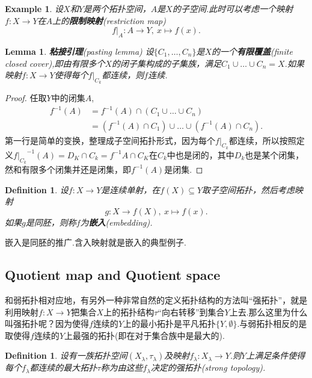 \documentclass{article}
\newtheorem{lemma}[theorem]{Lemma}
\newtheorem{example}[theorem]{Example}
\newtheorem{definition}[theorem]{Definition}
\newcommand*{\xfunc}[4]{{#2}\colon{#3}{#1}{#4}}
\newcommand*{\func}[3]{\xfunc{\to}{#1}{#2}{#3}}
\begin{document}
\begin{example}
设$X$和$Y$是两个拓扑空间，$A$是$X$的子空间.此时可以考虑一个映射$\func{f}{X}{Y}$在$A$上的\textbf{限制映射}(restriction map)\[\func{f|_A}{A}{Y},\ x \mapsto f(x).\]
\end{example}

\begin{lemma}
\textbf{粘接引理}(pasting lemma) 设$\{C_1,\ldots,C_n\}$是$X$的一个\textbf{有限覆盖}(finite closed cover),即由有限多个$X$的闭子集构成的子集族，满足$C_1 \cup \ldots \cup C_n=X$.如果映射$\func{f}{X}{Y}$使得每个$f|_{C_k}$都连续，则$f$连续.
\end{lemma}

\begin{proof}
任取$Y$中的闭集$A$,\[\begin{aligned} 
					f^{-1}(A)&=f^{-1}(A) \cap (C_1 \cup \ldots \cup C_n)\\
					&=(f^{-1}(A) \cap C_1) \cup \ldots \cup (f^{-1}(A) \cap C_n).\end{aligned}\]第一行是简单的变换，整理成子空间拓扑形式，因为每个$f|_{C_k}$都连续，所以按照定义${f|_{C_k}}^{-1}(A)=D_K \cap C_k = f^{-1}{A} \cap C_K $在$C_k$中也是闭的，其中$D_k$也是某个闭集，然和有限多个闭集并还是闭集，即$f^{-1}(A)$是闭集.
\end{proof}

\begin{definition}
设$\func{f}{X}{Y}$是连续单射，在$f(X) \subseteq Y$取子空间拓扑，然后考虑映射\[\func{g}{X}{f(X)},\ x \mapsto f(x).\]如果$g$是同胚，则称$f$为\textbf{嵌入}(embedding).
\end{definition}

嵌入是同胚的推广.含入映射就是嵌入的典型例子.


\newpage
\subsection{Quotient map and Quotient space}
和弱拓扑相对应地，有另外一种非常自然的定义拓扑结构的方法叫“强拓扑”，就是利用映射$\func{f}{X}{Y}$把集合$X$上的拓扑结构$\tau$“向右转移”到集合$Y$上去.那么这里为什么叫强拓扑呢？因为使得$f$连续的$Y$上的最小拓扑是平凡拓扑$\{Y,\emptyset\}$.与弱拓扑相反的是取使得$f$连续的$Y$上最强的拓扑(即在对于集合族中是最大的).


\begin{definition}
设有一族拓扑空间$(X_\lambda,\tau_\lambda)$及映射$\func{f_\lambda}{X_\lambda}{Y}$.则$Y$上满足条件使得每个$f_\lambda$都连续的最大拓扑$\tau$称为由这些$f_\lambda$决定的强拓扑(strong topology).
\end{definition}
\end{document}
